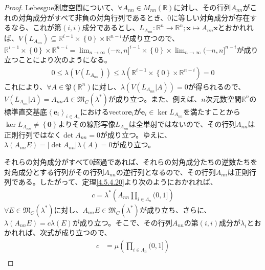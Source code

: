 \documentclass[dvipdfmx]{jsarticle}
\begin{document}
\begin{proof}
Lebesgue測度空間について、$\forall A_{nn} \in M_{nn}\left( \mathbb{R} \right)$に対し、その行列$A_{nn}$がこれの対角成分がすべて非負の対角行列であるとき、$0$に等しい対角成分が存在するなら、これが第$(i,i)$成分であるとし、$L_{A_{nn}}:\mathbb{R}^{n} \rightarrow \mathbb{R}^{n};\mathbf{x} \mapsto A_{nn}\mathbf{x}$とおかれれば、$V\left( L_{A_{nn}} \right) \subseteq \mathbb{R}^{i - 1} \times \left\{ 0 \right\} \times \mathbb{R}^{n - i}$が成り立つので、$\mathbb{R}^{i - 1} \times \left\{ 0 \right\} \times \mathbb{R}^{n - i} = {\lim_{n \rightarrow \infty}( - n,n]}^{i - 1} \times \left\{ 0 \right\} \times {\lim_{n \rightarrow \infty}( - n,n]}^{n - i}$が成り立つことにより次のようになる。
\begin{align*}
0 \leq \lambda\left( V\left( L_{A_{nn}} \right) \right) \leq \lambda\left( \mathbb{R}^{i - 1} \times \left\{ 0 \right\} \times \mathbb{R}^{n - i} \right) = 0
\end{align*}
これにより、$\forall A \in \mathfrak{P}\left( \mathbb{R}^{n} \right)$に対し、$\lambda\left( V\left( L_{A_{nn}}|A \right) \right) = 0$が得られるので、$V\left( L_{A_{nn}}|A \right) = A_{nn}A \in \mathfrak{M}_{C}\left( \lambda^{*} \right)$が成り立つ。また、例えば、$n$次元数空間$\mathbb{R}^{n}$の標準直交基底$\left\langle \mathbf{e}_{i} \right\rangle_{i \in \varLambda_{n}}$におけるvector$\mathbf{e}_{i}$が$\mathbf{e}_{i} \in \ker L_{A_{nn}}$を満たすことから$\ker L_{A_{nn}} \neq \left\{ \mathbf{0} \right\}$よりその線形写像$L_{A_{nn}}$は全単射ではないので、その行列$A_{nn}$は正則行列ではなく$\det A_{nn} = 0$が成り立つ。ゆえに、$\lambda\left( A_{nn}E \right) = \left| \det A_{nn} \right|\lambda(A) = 0$が成り立つ。\par
それらの対角成分がすべて$0$超過であれば、それらの対角成分たちの逆数たちを対角成分とする行列がその行列$A_{nn}$の逆行列となるので、その行列$A_{nn}$は正則行列である。したがって、定理\ref{4.5.4.20}より次のようにおかれれば、
\begin{align*}
c = \lambda^{*}\left( A_{nn}\prod_{i \in \varLambda_{n}} (0,1] \right)
\end{align*}
$\forall E \in \mathfrak{M}_{C}\left( \lambda^{*} \right)$に対し、$A_{nn}E \in \mathfrak{M}_{C}\left( \lambda^{*} \right)$が成り立ち、さらに、$\lambda\left( A_{nn}E \right) = c\lambda(E)$が成り立つ。そこで、その行列$A_{nn}$の第$(i,i)$成分が$\lambda_{i}$とおかれれば、次式が成り立つので、
\begin{align*}
c &= \mu\left( \prod_{i \in \varLambda_{n}} (0,1] \right)\\

\end{align*}
\end{proof}
\end{document}
